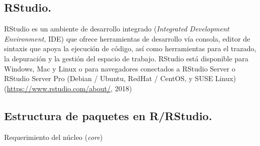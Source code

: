 \subsection{RStudio.}

RStudio es un ambiente de desarrollo integrado (\textit{Integrated Development Environment}, IDE) que ofrece herramientas de desarrollo vía consola, editor de sintaxis que apoya la ejecución de código, así como herramientas para el trazado, la depuración y la gestión del espacio de trabajo.  RStudio está disponible para Windows, Mac y Linux o para navegadores conectados a RStudio Server o RStudio Server Pro (Debian / Ubuntu, RedHat / CentOS, y SUSE Linux) (\url{https://www.rstudio.com/about/}, 2018)
 

\subsection{Estructura de paquetes en R/RStudio.}

Requerimiento del núcleo (\textit{core})

